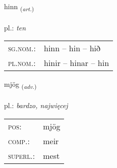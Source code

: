 \documentclass[frontgrid, backgrid]{flacards}\usepackage[]{graphicx}\usepackage[]{xcolor}
\begin{document}
\renewcommand{\blhead}{\vskip5pt {\small\bfseries\footnotesize Greinir | Article }}
\renewcommand{\bcfoot}{\vskip5pt \hspace{2pt}{\small\bfseries\footnotesize 1K}}


{hinn \small{\textsubscript{(\textit{art.})}} \\[1ex] %
\textphonetic{[hɪn]} \\
pl.: \emph{ten} \\  [2ex]
\renewcommand*{\arraystretch}{0.8}
\begin{tabular}{ll}
\textsc{sg.nom.}: & hinn  --  hin -- hið \\ 
\textsc{pl.nom.}: & hinir -- hinar -- hin
\end{tabular}
}

\renewcommand{\flhead}{\vskip5pt \fboxsep=0pt {\small\bfseries\footnotesize Atviksorð | Adverb}}
\renewcommand{\fcfoot}{\vskip5pt \fboxsep=0pt \hspace{2pt}{\small\bfseries\footnotesize 1K}}

\renewcommand{\blhead}{\vskip5pt {\small\bfseries\footnotesize Atviksorð | Adverb }}
\renewcommand{\bcfoot}{\vskip5pt \hspace{2pt}{\small\bfseries\footnotesize 1K}}


{mjög \small{\textsubscript{(\textit{adv.})}} \\[1ex] %
\textphonetic{[mjœːɣ]} \\
pl.: \emph{bardzo, najwięcej} \\  [2ex]
\renewcommand*{\arraystretch}{0.8}
\begin{tabular}{ll}
\textsc{pos}: & mjög \\ 
\textsc{comp.}: & meir \\ 
\textsc{superl.}: & mest \\
\end{tabular}
}

\renewcommand{\flhead}{\vskip5pt \fboxsep=0pt {\small\bfseries\footnotesize Sagnorð | Verb}}
\renewcommand{\fcfoot}{\vskip5pt \fboxsep=0pt \hspace{2pt}{\small\bfseries\footnotesize 1K}}
\end{document}
